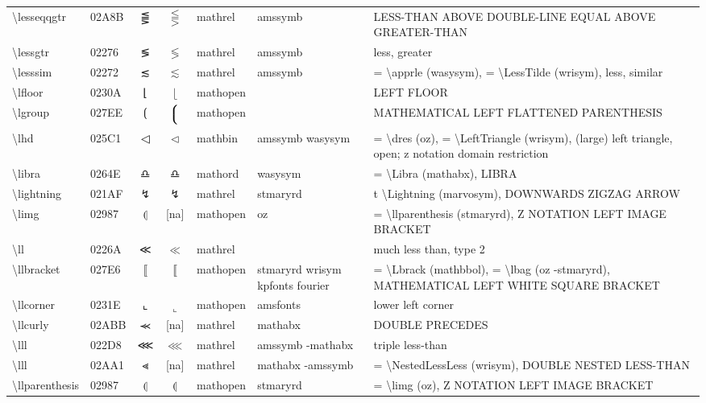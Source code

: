 \documentclass[a4paper,landscape]{article}
\begin{document}
\begin{longtable}{llcclll}
\textbackslash{}lesseqqgtr & 02A8B & ⪋ & $\lesseqqgtr$ & mathrel & amssymb & LESS-THAN ABOVE DOUBLE-LINE EQUAL ABOVE GREATER-THAN \\
\textbackslash{}lessgtr & 02276 & ≶ & $\lessgtr$ & mathrel & amssymb & less, greater \\
\textbackslash{}lesssim & 02272 & ≲ & $\lesssim$ & mathrel & amssymb & = \textbackslash{}apprle (wasysym), = \textbackslash{}LessTilde (wrisym), less, similar \\
\textbackslash{}lfloor & 0230A & ⌊ & $\lfloor$ & mathopen &  & LEFT FLOOR \\
\textbackslash{}lgroup & 027EE & ⟮ & $\left\lgroup\right.$ & mathopen &  & MATHEMATICAL LEFT FLATTENED PARENTHESIS \\
\textbackslash{}lhd & 025C1 & ◁ & $\lhd$ & mathbin & amssymb wasysym & = \textbackslash{}dres (oz), = \textbackslash{}LeftTriangle (wrisym), (large) left triangle, open; z notation domain restriction \\
\textbackslash{}libra & 0264E & \textsf ♎ & $\libra$ & mathord & wasysym & = \textbackslash{}Libra (mathabx), LIBRA \\
\textbackslash{}lightning & 021AF & ↯ & $\lightning$ & mathrel & stmaryrd & t \textbackslash{}Lightning (marvosym), DOWNWARDS ZIGZAG ARROW \\
\textbackslash{}limg & 02987 & ⦇ & [na] & mathopen & oz & = \textbackslash{}llparenthesis (stmaryrd), Z NOTATION LEFT IMAGE BRACKET \\
\textbackslash{}ll & 0226A & ≪ & $\ll$ & mathrel &  & much less than, type 2 \\
\textbackslash{}llbracket & 027E6 & ⟦ & $\llbracket$ & mathopen & stmaryrd wrisym kpfonts fourier & = \textbackslash{}Lbrack (mathbbol), = \textbackslash{}lbag (oz -stmaryrd), MATHEMATICAL LEFT WHITE SQUARE BRACKET \\
\textbackslash{}llcorner & 0231E & ⌞ & $\llcorner$ & mathopen & amsfonts & lower left corner \\
\textbackslash{}llcurly & 02ABB & ⪻ & [na] & mathrel & mathabx & DOUBLE PRECEDES \\
\textbackslash{}lll & 022D8 & ⋘ & $\lll$ & mathrel & amssymb -mathabx & triple less-than \\
\textbackslash{}lll & 02AA1 & ⪡ & [na] & mathrel & mathabx -amssymb & = \textbackslash{}NestedLessLess (wrisym),  DOUBLE NESTED LESS-THAN \\
\textbackslash{}llparenthesis & 02987 & ⦇ & $\llparenthesis$ & mathopen & stmaryrd & = \textbackslash{}limg (oz),  Z NOTATION LEFT IMAGE BRACKET \\

\end{longtable}
\end{document}
